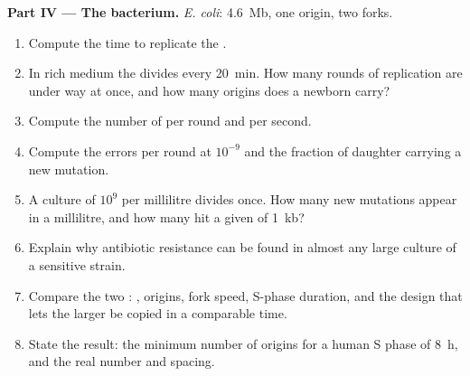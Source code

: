 \begin{problem}
\medskip
\noindent\textbf{Part IV --- The bacterium.}
\emph{E. coli}: \qty{4.6}{Mb}, one origin, two forks.
\begin{enumerate}[resume]
  \item Compute the time to replicate the .
  \item In rich medium the  divides every \qty{20}{min}. How many
        rounds of replication are under way at once, and how many
        origins does a newborn  carry?
  \item Compute the number of  per round and per
        second.
  \item Compute the errors per round at $10^{-9}$ and the fraction of
        daughter  carrying a new mutation.
  \item A culture of $10^9$  per millilitre divides once. How
        many new mutations appear in a millilitre, and how many hit a
        given  of \qty{1}{kb}?
  \item Explain why antibiotic resistance can be found in almost any
        large culture of a sensitive strain.
  \item Compare the two : , origins, fork speed,
        S-phase duration, and the design that lets the larger 
        be copied in a comparable time.
  \item State the result: the minimum number of origins for a human
        S phase of \qty{8}{h}, and the real number and spacing.
\end{enumerate}
\end{problem}
